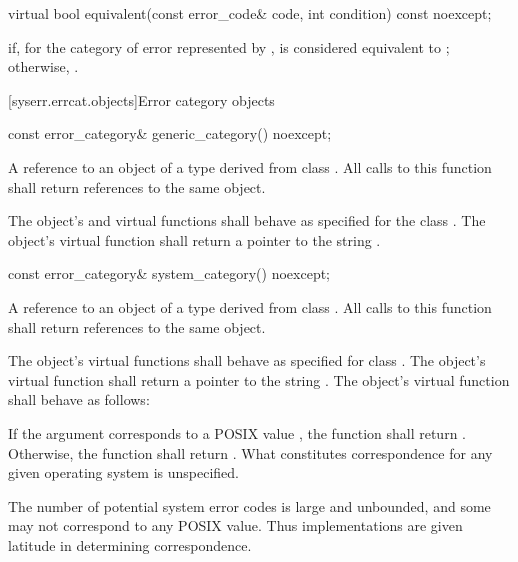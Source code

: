 %
\begin{itemdecl}
virtual bool equivalent(const error_code& code, int condition) const noexcept;
\end{itemdecl}

\begin{itemdescr}
\pnum
\returns {} if, for the category of error represented by ,  is considered equivalent to ; otherwise, .
\end{itemdescr}

[syserr.errcat.objects]{Error category objects}

%
\begin{itemdecl}
const error_category& generic_category() noexcept;
\end{itemdecl}

\begin{itemdescr}
\pnum
\returns A reference to an object of a type derived from class .
All calls to this function shall return references to the same object.

\pnum
\remarks The object's  and  virtual functions shall behave as specified for the class . The object's  virtual function shall return a pointer to the string .
\end{itemdescr}

%
\begin{itemdecl}
const error_category& system_category() noexcept;
\end{itemdecl}

\begin{itemdescr}
\pnum
\returns A reference to an object of a type derived from class .
All calls to this function shall return references to the same object.

\pnum
\remarks The object's  virtual functions shall behave as specified for
class . The object's  virtual function shall return a
pointer to the string . The object's 
virtual function shall behave as follows:

If the argument  corresponds to a POSIX  value , the
function shall return .
Otherwise, the function shall return . What constitutes correspondence for any given operating
system is unspecified. \begin{note} The number of potential system error codes is large
and unbounded, and some may not correspond to any POSIX  value. Thus
implementations are given latitude in determining correspondence. \end{note}
\end{itemdescr}

